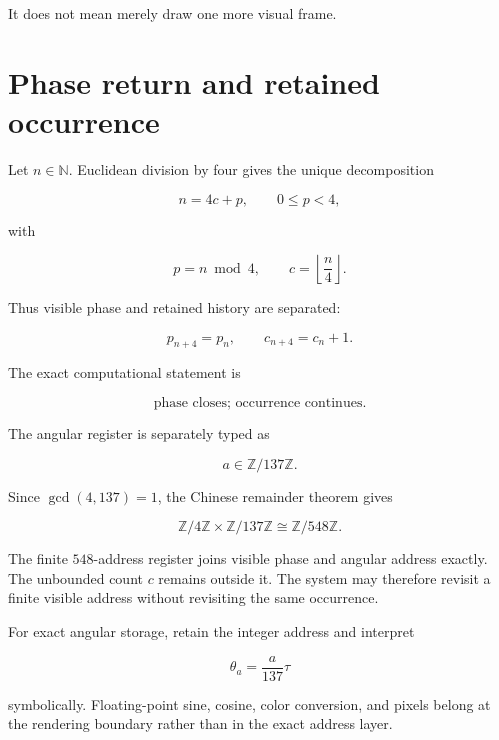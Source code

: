 \documentclass[11pt,letterpaper]{article}
\theoremstyle{clearonyx}
\newcommand{\Z}{\mathbb{Z}}
\newcommand{\N}{\mathbb{N}}
\begin{document}
It does not mean merely draw one more visual frame.

\section{Phase return and retained occurrence}

Let $n\in\N$.  Euclidean division by four gives the unique decomposition

\begin{equation}
n=4c+p,
\qquad
0\le p<4,
\end{equation}

with

\begin{equation}
p=n\bmod4,
\qquad
c=\left\lfloor\frac n4\right\rfloor.
\end{equation}

Thus visible phase and retained history are separated:

\begin{equation}
p_{n+4}=p_n,
\qquad
c_{n+4}=c_n+1.
\end{equation}

The exact computational statement is

\begin{equation}
\boxed{\text{phase closes; occurrence continues}.}
\end{equation}

The angular register is separately typed as

\begin{equation}
a\in\Z/137\Z.
\end{equation}

Since $\gcd(4,137)=1$, the Chinese remainder theorem gives

\begin{equation}
\Z/4\Z\times\Z/137\Z\cong\Z/548\Z.
\end{equation}

The finite $548$-address register joins visible phase and angular address exactly.  The unbounded count $c$ remains outside it.  The system may therefore revisit a finite visible address without revisiting the same occurrence.

For exact angular storage, retain the integer address and interpret

\begin{equation}
\theta_a=\frac{a}{137}\tau
\end{equation}

symbolically.  Floating-point sine, cosine, color conversion, and pixels belong at the rendering boundary rather than in the exact address layer.
\end{document}
